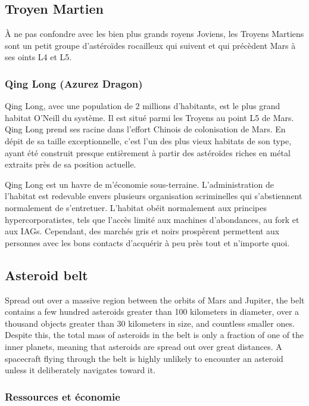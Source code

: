 \subsection{Troyen Martien} \label{sec:martian-trojans} 

À ne pas confondre avec les bien plus grands royens Joviens, les Troyens Martiens sont un petit groupe d'astéroïdes rocailleux qui suivent et qui précèdent Mars à ses oints L4 et L5. 

\subsubsection{Qing Long (Azurez Dragon)} \label{sec:qing-long-azurez} 

Qing Long, avec une population de 2 millions d'habitants, est le plus grand habitat O'Neill du système. Il est situé parmi les Troyens au point L5 de Mars. Qing Long prend ses racine dans l'effort Chinois de colonisation de Mars. En dépit de sa taille exceptionnelle, c'est l'un des plus vieux habitats de son type, ayant été construit presque entièrement à partir des astéroïdes riches en métal extraits près de sa position actuelle. 

Qing Long est un havre de m'économie sous-terraine. L'administration de l'habitat est redevable envers plusieurs organisation scriminelles qui s'abstiennent normalement de s'entretuer. L'habitat obéit normalement aux principes hypercorporatistes, tels que l'accès limité aux machines d'abondances, au fork et aux IAGs. Cependant, des marchés gris et noirs prospèrent permettent aux personnes avec les bons contacts d'acquérir à peu près tout et n'importe quoi. 

\subsection{Asteroid belt} \label{sec:asteroid-belt} 

Spread out over a massive region between the orbits of Mars and Jupiter, the belt contains a few hundred asteroids greater than 100 kilometers in diameter, over a thousand objects greater than 30 kilometers in size, and countless smaller ones. Despite this, the total mass of asteroids in the belt is only a fraction of one of the inner planets, meaning that asteroids are spread out over great distances. A spacecraft flying through the belt is highly unlikely to encounter an asteroid unless it deliberately navigates toward it. 

\subsubsection{Ressources et économie} \label{sec:asteroid-resources-economics} 

